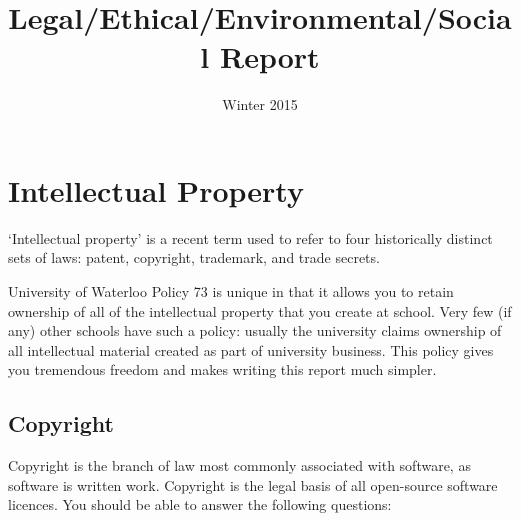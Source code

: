 \documentclass{tufte-handout}
\title{Legal/Ethical/Environmental/Social Report}
\author{\teamname\marginnote{\studentnames}}
\date{Winter 2015}
\begin{document}
\maketitle




\newlength{\dfrtmpparskip}
\providecommand{\tighttableofcontents}{
    \setlength{\dfrtmpparskip}{\parskip}
    \setlength{\parskip}{0pt plus 1ex}
    \tableofcontents
    \setlength{\parskip}{\dfrtmpparskip}
}
\tighttableofcontents

\clearpage
\section{Intellectual Property} 

`Intellectual property' is a recent term used to refer to four
historically distinct sets of laws: patent, copyright, trademark, and
trade secrets.\cite{Stallman-not-ipr} 

University of Waterloo Policy 73\cite{UW-Policy73} is unique in that
it allows you to retain ownership of all of the intellectual property
that you create at school. Very few (if any) other schools have such a
policy: usually the university claims ownership of all intellectual
material created as part of university business. 
%
This policy gives you tremendous freedom and makes writing this report
much simpler. 

\subsection{Copyright} 

Copyright is the branch of law most commonly associated with software,
as software is written work. Copyright is the legal basis of all
open-source software licences. You should be able to answer the
following questions:
\end{document}
